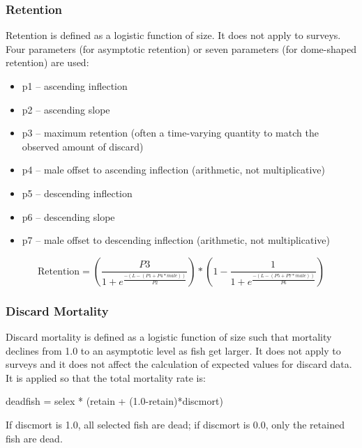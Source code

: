 
\subsubsection{Retention}
Retention is defined as a logistic function of size.  It does not apply to surveys.  Four parameters (for asymptotic retention) or seven parameters (for dome-shaped retention) are used:
\begin{itemize}
	\item p1 – ascending inflection
	\item p2 – ascending slope
	\item p3 – maximum retention (often a time-varying quantity to match the observed amount of discard)
	\item p4 – male offset to ascending inflection (arithmetic, not multiplicative)
	\item p5 – descending inflection
	\item p6 – descending slope
	\item p7 – male offset to descending inflection (arithmetic, not multiplicative)
\end{itemize}
\begin{equation}
	\text{Retention} = \left(\frac{P3}{1 + e^{\frac{-(L-(P1+P4*male))}{P2}}}\right)*\left(1 - \frac{1}{1 + e^{\frac{-(L-(P5+P7*male))}{P6}}}\right)
\end{equation}

\subsubsection{Discard Mortality}
Discard mortality is defined as a logistic function of size such that mortality declines from 1.0 to an asymptotic level as fish get larger.  It does not apply to surveys and it does not affect the calculation of expected values for discard data.   It is applied so that the total mortality rate is:\\
\begin{center}
	deadfish = selex * (retain + (1.0-retain)*discmort)
\end{center}
If discmort is 1.0, all selected fish are dead; if discmort is 0.0, only the retained fish are dead.

